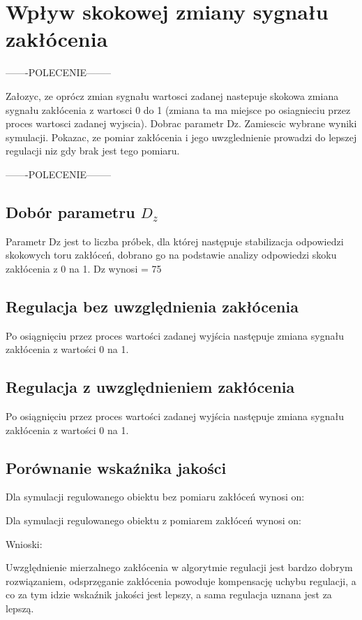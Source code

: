 \section{Wpływ skokowej zmiany sygnału zakłócenia}

-------POLECENIE--------

Załozyc, ze oprócz zmian sygnału wartosci zadanej nastepuje skokowa zmiana sygnału
zakłócenia z wartosci 0 do 1 (zmiana ta ma miejsce po osiagnieciu przez proces wartosci
zadanej wyjscia). Dobrac parametr Dz. Zamiescic wybrane wyniki symulacji. Pokazac,
ze pomiar zakłócenia i jego uwzglednienie prowadzi do lepszej regulacji niz gdy brak
jest tego pomiaru.

-------POLECENIE--------



\subsection{Dobór parametru $D_z$}

Parametr Dz jest to liczba próbek, dla której następuje stabilizacja odpowiedzi skokowych toru zakłóceń, 
dobrano go na podstawie analizy odpowiedzi skoku
zakłócenia z 0 na 1.
Dz wynosi = 75

\subsection{Regulacja bez uwzględnienia zakłócenia}

Po osiągnięciu przez proces wartości zadanej wyjścia następuje zmiana sygnału
zakłócenia z wartości 0 na 1.

\subsection{Regulacja z uwzględnieniem zakłócenia}

Po osiągnięciu przez proces wartości zadanej wyjścia następuje zmiana sygnału
zakłócenia z wartości 0 na 1.

\subsection{Porównanie wskaźnika jakości}

Dla symulacji regulowanego obiektu bez pomiaru zakłóceń wynosi on:

Dla symulacji regulowanego obiektu z pomiarem zakłóceń wynosi on:

Wnioski: 

Uwzględnienie mierzalnego zakłócenia w algorytmie regulacji jest bardzo dobrym rozwiązaniem, 
odsprzęganie zakłócenia powoduje kompensację uchybu regulacji, 
a co za tym idzie wskaźnik jakości jest lepszy, 
a sama regulacja uznana jest za lepszą.

